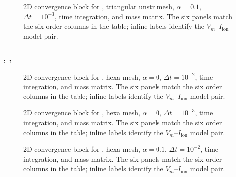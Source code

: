 \begin{figure}[p]
\centering
{}
\caption{2D convergence block for , triangular unstr mesh, $\alpha=0.1$, $\Delta t=10^{-3}$,  time integration, and  mass matrix. The six panels match the six order columns in the table; inline labels identify the $V_m$--$I_{\mathrm{ion}}$ model pair.}
\label{fig:results-2d-picard-triangular-unstr-alpha-1p0em01-1p0em03}
\end{figure}
\FloatBarrier

\subsubsection{, , }



\begin{figure}[p]
\centering
{}
\caption{2D convergence block for , hexa mesh, $\alpha=0$, $\Delta t=10^{-2}$,  time integration, and  mass matrix. The six panels match the six order columns in the table; inline labels identify the $V_m$--$I_{\mathrm{ion}}$ model pair.}
\label{fig:results-2d-diagonaliion-hexa-alpha-0p0e00-1p0em02}
\end{figure}
\FloatBarrier

\begin{figure}[p]
\centering
{}
\caption{2D convergence block for , hexa mesh, $\alpha=0$, $\Delta t=10^{-3}$,  time integration, and  mass matrix. The six panels match the six order columns in the table; inline labels identify the $V_m$--$I_{\mathrm{ion}}$ model pair.}
\label{fig:results-2d-diagonaliion-hexa-alpha-0p0e00-1p0em03}
\end{figure}
\FloatBarrier

\begin{figure}[p]
\centering
{}
\caption{2D convergence block for , hexa mesh, $\alpha=0.1$, $\Delta t=10^{-2}$,  time integration, and  mass matrix. The six panels match the six order columns in the table; inline labels identify the $V_m$--$I_{\mathrm{ion}}$ model pair.}
\label{fig:results-2d-diagonaliion-hexa-alpha-1p0em01-1p0em02}
\end{figure}
\FloatBarrier


